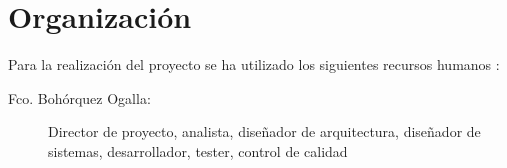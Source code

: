 

\section{Organización}
Para la realización del proyecto se ha utilizado los siguientes recursos humanos :
\begin{description}
\item[Fco. Bohórquez Ogalla:] Director de proyecto, analista, diseñador de arquitectura, diseñador de sistemas, desarrollador, tester, control de calidad
\end{description}

